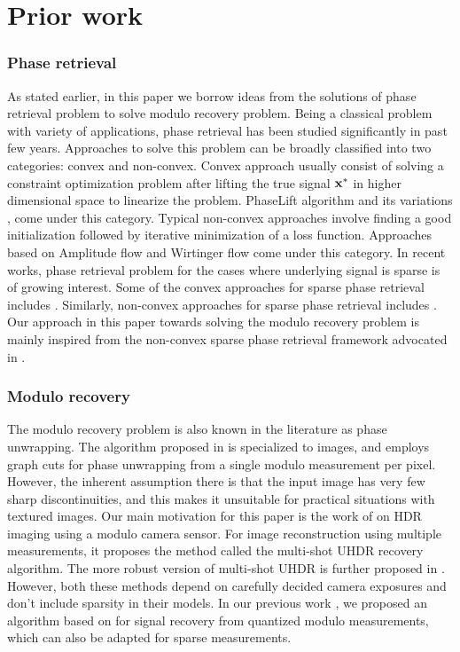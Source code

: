 \section{Prior work}
\label{sec:prior}

\subsubsection*{Phase retrieval} As stated earlier, in this paper we borrow ideas from the solutions of phase retrieval problem to solve modulo recovery problem. Being a classical problem with variety of applications, phase retrieval has been studied significantly in past few years. Approaches to solve this problem can be broadly classified into two categories: convex and non-convex. 
Convex approach usually consist of solving a constraint optimization problem after lifting the true signal $\mathbf{x^*}$ in higher dimensional space to linearize the problem. PhaseLift algorithm \cite{candes2013phaselift} and its variations \cite{gross2017improved}, \cite{candes2015phasediff} come under this category. Typical non-convex approaches involve finding a good initialization followed by iterative minimization of a loss function. Approaches based on Amplitude flow \cite{wang2016sparse,wang2016solving} and Wirtinger flow \cite{candes2015phase, zhang2016reshaped,  chen2015solving, cai2016optimal} come under this category. 
In recent works, phase retrieval problem for the cases where underlying signal is sparse is of growing interest. Some of the convex approaches for sparse phase retrieval includes \cite{ohlsson2012cprl, li2013sparse,bahmani2015efficient,jaganathan2012recovery}. Similarly, non-convex approaches for sparse phase retrieval includes \cite{netrapalli2013phase, cai2016optimal, wang2016sparse}. Our approach in this paper towards solving the modulo recovery problem is mainly inspired from the non-convex sparse phase retrieval framework advocated in \cite{Jagatap2017}. 

\subsubsection*{Modulo recovery} The modulo recovery problem is also known in the literature
as phase unwrapping. The algorithm proposed in \cite{bioucas2007phase} is specialized to images, and employs graph cuts for phase unwrapping from a single modulo measurement per pixel. However, the inherent assumption there is that the input image has very few sharp discontinuities, and this makes it unsuitable for practical situations with textured images. Our main motivation for this paper is the work of \cite{ICCP15_Zhao} on HDR imaging using a modulo camera sensor. For image reconstruction using multiple measurements, it proposes the method called the multi-shot UHDR recovery algorithm. The more robust version of multi-shot UHDR is further proposed in \cite{Lang2017}. However, both these methods depend on carefully decided camera exposures and don't include sparsity in their models. In our previous work \cite{Shah}, we proposed an algorithm based on \cite{ICCP15_Zhao, soltani2017stable} for signal recovery from quantized modulo measurements, which can also be adapted for sparse measurements. 

